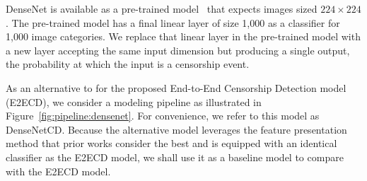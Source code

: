 DenseNet is available as a pre-trained model~\cite{pytorchdensenet} 
that expects images sized $224 \times 224$. The pre-trained model has a final linear
layer of size 1,000 as a classifier for 1,000 image categories.  We replace
that linear layer in the pre-trained model with a new layer accepting the same
input dimension but producing a single output, the probability at which 
the input is a censorship event.  

As an alternative to for the proposed End-to-End
Censorship Detection model (E2ECD), we consider a modeling pipeline as
illustrated in Figure~\ref{fig:pipeline:densenet}. For convenience, we refer to
this model as DenseNetCD. Because the alternative model leverages the feature presentation method
that prior works consider the best and is equipped with an identical classifier as the
E2ECD model, we shall use it as a baseline model to compare
with the E2ECD model. 






